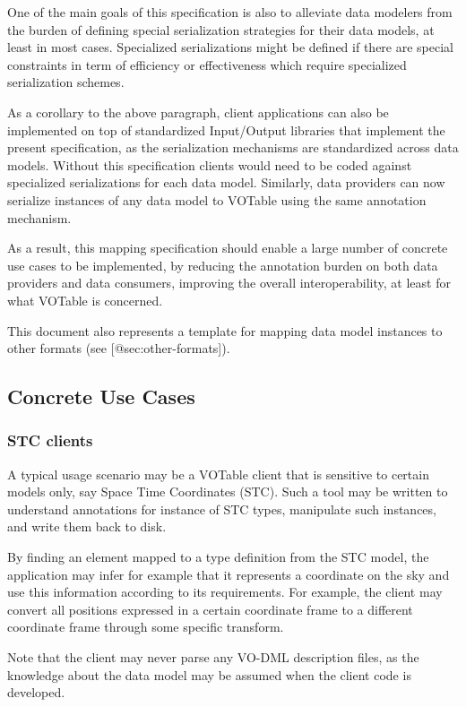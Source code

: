 \documentclass[11pt,a4paper]{ivoa}
\begin{document}
One of the main goals of this specification is also to alleviate data
modelers from the burden of defining special serialization strategies
for their data models, at least in most cases. Specialized
serializations might be defined if there are special constraints in term
of efficiency or effectiveness which require specialized serialization
schemes.

As a corollary to the above paragraph, client applications can also be
implemented on top of standardized Input/Output libraries that implement
the present specification, as the serialization mechanisms are
standardized across data models. Without this specification clients
would need to be coded against specialized serializations for each data
model. Similarly, data providers can now serialize instances of any data
model to VOTable using the same annotation mechanism.

As a result, this mapping specification should enable a large number of
concrete use cases to be implemented, by reducing the annotation burden
on both data providers and data consumers, improving the overall
interoperability, at least for what VOTable is concerned.

This document also represents a template for mapping data model
instances to other formats (see {[}@sec:other-formats{]}).

\subsection{Concrete Use Cases}\label{concrete-use-cases}

\subsubsection{STC clients}\label{stc-clients}

A typical usage scenario may be a VOTable client that is sensitive to
certain models only, say Space Time Coordinates (STC). Such a tool may
be written to understand annotations for instance of STC types,
manipulate such instances, and write them back to disk.

By finding an element mapped to a type definition from the STC model,
the application may infer for example that it represents a coordinate on
the sky and use this information according to its requirements. For
example, the client may convert all positions expressed in a certain
coordinate frame to a different coordinate frame through some specific
transform.

Note that the client may never parse any VO-DML description files, as
the knowledge about the data model may be assumed when the client code
is developed.
\end{document}

